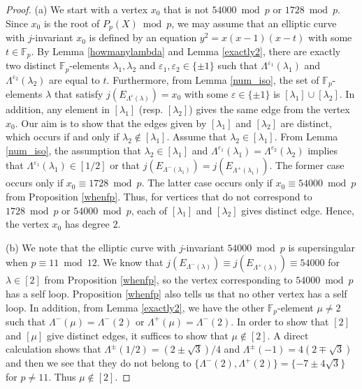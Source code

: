 \documentclass[a4paper, 11pt]{article}
\theoremstyle{plain}
\newcommand{\?}{\textcolor{red}{??}}
\newcommand{\lm}{\lambda}
\newcommand{\Lm}{\Lambda}
\newcommand{\fp}{\mathbb{F}_p}
\begin{document}
\begin{proof}
(a) We start with a vertex $x_0$ that is not $54000 \bmod p $ or $1728 \bmod p $.  Since $x_0$ is the root of $P_p(X) \bmod p$, we may assume that an elliptic curve with $j$-invariant $x_0$ is defined by an equation $y^2=x(x-1)(x-t)$ with some $t\in \fp$.  By Lemma \ref{howmanylambda} and Lemma \ref{exactly2}, there are exactly two distinct $\fp$-elements $\lm_1,\lm_2$ and $\varepsilon_1,\varepsilon_2 \in \{\pm1\}$ such that $\Lm^{\varepsilon_1}(\lm_1)$ and $\Lm^{\varepsilon_2}(\lm_2)$ are equal to $t$.  Furthermore, from Lemma \ref{num_iso}, the set of $\fp$-elements $\lm$ that satisfy $j(E_{\Lm^{\varepsilon}(\lm)})=x_0$ with some $\varepsilon\in\{\pm1\}$ is $[\lm_1]\cup[\lm_2]$.  In addition, any element in $[\lm_1]$ (resp. $[\lm_2]$) gives the same edge from the vertex $x_0$. Our aim is to  show that the edges given by $[\lm_1]$ and $[\lm_2]$ are distinct, which occurs if and only if $\lm_2 \notin [\lm_1]$. Assume that $\lm_2\in [\lm_1]$. From Lemma \ref{num_iso}, the assumption that $\lm_2\in [\lm_1]$ and $\Lm^{\varepsilon_1}(\lm_1)=\Lm^{\varepsilon_2}(\lm_2)$ implies that $\Lm^{\varepsilon_1}(\lm_1)\in[1/2]$ or that $j\left(E_{\Lm^{-}(\lm_1)}\right)=j\left(E_{\Lm^{+}(\lm_1)}\right)$. The former case occurs only if $x_0\equiv1728\bmod p$. The latter case occurs only if $x_0\equiv54000 \bmod p$ from Proposition \ref{whenfp}. Thus, for vertices that do not correspond to $1728 \bmod p $ or $54000 \bmod p$, each of $[\lm_1]$ and $[\lm_2]$ gives distinct edge. Hence, the vertex $x_0$ has degree $2$.

(b) We note that the elliptic curve with $j$-invariant $54000\bmod p$ is supersingular when $p \equiv 11 \bmod 12$.  We know that $j(E_{\Lm^{-}(\lm)})\equiv j(E_{\Lm^{+}(\lm)})\equiv54000$ for $\lm\in[2]$ from Proposition \ref{whenfp}, so the vertex corresponding to $54000 \bmod p$ has a self loop. Proposition \ref{whenfp} also tells us that no other vertex has a self loop. In addition, from Lemma \ref{exactly2}, we have the other $\fp$-element $\mu\ne2$ such that $\Lm^{-}(\mu)=\Lm^{-}(2)$ or $\Lm^{+}(\mu)=\Lm^{-}(2)$. In order to show that $[2]$ and $[\mu]$ give distinct edges, it suffices to show that $\mu\notin [2]$. A direct calculation shows that $\Lm^{\pm}(1/2)=(2\pm\sqrt{3})/4$ and $\Lm^{\pm}(-1)=4(2\mp\sqrt{3})$ and then we see that they do not belong to $\{\Lm^{-}(2),\Lm^{+}(2)\}=\{-7\pm4\sqrt{3}\}$ for $p\ne 11$. Thus $\mu \notin[2]$.



\end{proof}
\end{document}
